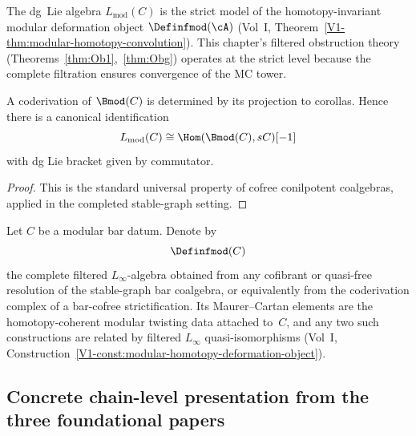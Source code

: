 \begin{remark}
\label{rem:lmod-strict-model}
The dg~Lie algebra $L_{\mathrm{mod}}(C)$ is the strict model of
the homotopy-invariant modular deformation object
$\Definfmod(\cA)$ (Vol~I,
Theorem~\ref*{V1-thm:modular-homotopy-convolution}).
This chapter's filtered obstruction theory
(Theorems~\ref{thm:Ob1},~\ref{thm:Obg}) operates at the strict
level because the complete filtration ensures convergence of the
MC tower.
\end{remark}

\begin{proposition}
A coderivation of $\Bmod(C)$ is determined by its projection to corollas. Hence there is
a canonical identification
\[
L_{\mathrm{mod}}(C)\cong \Hom(\Bmod(C),sC)[-1]
\]
with dg Lie bracket given by commutator.
\end{proposition}

\begin{proof}
This is the standard universal property of cofree conilpotent coalgebras, applied in the
completed stable-graph setting.
\end{proof}

\begin{construction}
\label{const:vol2-homotopy-modular-object}
Let $C$ be a modular bar datum. Denote by
\[
\Definfmod(C)
\]
the complete filtered $L_\infty$-algebra obtained from any cofibrant or
quasi-free resolution of the stable-graph bar coalgebra, or equivalently
from the coderivation complex of a bar-cofree strictification. Its
Maurer--Cartan elements are the homotopy-coherent modular twisting data
attached to~$C$, and any two such constructions are related by filtered
$L_\infty$ quasi-isomorphisms
(Vol~I, Construction~\ref*{V1-const:modular-homotopy-deformation-object}).
\end{construction}


\subsection{Concrete chain-level presentation from the three foundational papers}
\label{subsec:vol2-three-preprints-chain-level}

